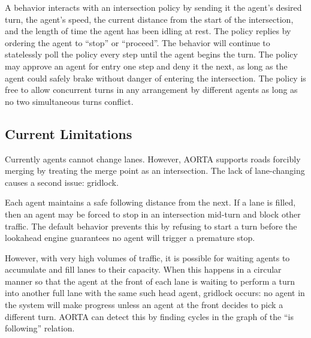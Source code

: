 \documentclass[letterpaper, 10 pt, conference]{ieeeconf}  %
\begin{document}
A behavior interacts with an intersection policy by sending it the agent's
desired turn, the agent's speed, the current distance from the start of the
intersection, and the length of time the agent has been idling at rest. The
policy replies by ordering the agent to ``stop'' or ``proceed''. The behavior
will continue to statelessly poll the policy every step until the agent begins
the turn. The policy may approve an agent for entry one step and deny it the
next, as long as the agent could safely brake without danger of entering the
intersection. The policy is free to allow concurrent turns in any arrangement by
different agents as long as no two simultaneous turns conflict.

\subsection{Current Limitations}

Currently agents cannot change lanes. However, AORTA supports roads forcibly
merging by treating the merge point as an intersection. The lack of
lane-changing causes a second issue: gridlock.

Each agent maintains a safe following distance from the next. If a lane is
filled, then an agent may be forced to stop in an intersection mid-turn and
block other traffic. The default behavior prevents this by refusing to start a
turn before the lookahead engine guarantees no agent will trigger a premature
stop.

However, with very high volumes of traffic, it is possible for waiting agents to
accumulate and fill lanes to their capacity. When this happens in a circular
manner so that the agent at the front of each lane is waiting to perform a turn
into another full lane with the same such head agent, gridlock \cite{AAAI11-au}
occurs: no agent in the system will make progress unless an agent at the front
decides to pick a different turn.  AORTA can detect this by finding cycles in
the graph of the ``is following'' relation.
\end{document}
